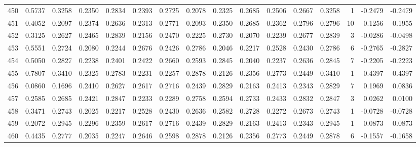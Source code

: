 \begin{tabular}{lrrrrrrrrrrrrrrr}
450 &      0.5737 &  0.3258 &  0.2350 &  0.2834 &  0.2393 &  0.2725 &  0.2078 &  0.2325 &  0.2685 &  0.2506 &   0.2667 &     0.3258 &      1 &                   -0.2479 &                    -0.2479 \\
451 &      0.4052 &  0.2097 &  0.2374 &  0.2636 &  0.2313 &  0.2771 &  0.2093 &  0.2350 &  0.2685 &  0.2362 &   0.2796 &     0.2796 &     10 &                   -0.1256 &                    -0.1955 \\
452 &      0.3125 &  0.2627 &  0.2465 &  0.2839 &  0.2156 &  0.2470 &  0.2225 &  0.2730 &  0.2070 &  0.2239 &   0.2677 &     0.2839 &      3 &                   -0.0286 &                    -0.0498 \\
453 &      0.5551 &  0.2724 &  0.2080 &  0.2244 &  0.2676 &  0.2426 &  0.2786 &  0.2046 &  0.2217 &  0.2528 &   0.2430 &     0.2786 &      6 &                   -0.2765 &                    -0.2827 \\
454 &      0.5050 &  0.2827 &  0.2238 &  0.2401 &  0.2422 &  0.2660 &  0.2593 &  0.2845 &  0.2040 &  0.2237 &   0.2636 &     0.2845 &      7 &                   -0.2205 &                    -0.2223 \\
455 &      0.7807 &  0.3410 &  0.2325 &  0.2783 &  0.2231 &  0.2257 &  0.2878 &  0.2126 &  0.2356 &  0.2773 &   0.2449 &     0.3410 &      1 &                   -0.4397 &                    -0.4397 \\
456 &      0.0860 &  0.1696 &  0.2410 &  0.2627 &  0.2617 &  0.2716 &  0.2439 &  0.2829 &  0.2163 &  0.2413 &   0.2343 &     0.2829 &      7 &                    0.1969 &                     0.0836 \\
457 &      0.2585 &  0.2685 &  0.2421 &  0.2847 &  0.2233 &  0.2289 &  0.2758 &  0.2594 &  0.2733 &  0.2433 &   0.2832 &     0.2847 &      3 &                    0.0262 &                     0.0100 \\
458 &      0.3471 &  0.2743 &  0.2025 &  0.2217 &  0.2528 &  0.2430 &  0.2636 &  0.2582 &  0.2728 &  0.2272 &   0.2673 &     0.2743 &      1 &                   -0.0728 &                    -0.0728 \\
459 &      0.2072 &  0.2945 &  0.2296 &  0.2359 &  0.2617 &  0.2716 &  0.2439 &  0.2829 &  0.2163 &  0.2413 &   0.2343 &     0.2945 &      1 &                    0.0873 &                     0.0873 \\
460 &      0.4435 &  0.2777 &  0.2035 &  0.2247 &  0.2646 &  0.2598 &  0.2878 &  0.2126 &  0.2356 &  0.2773 &   0.2449 &     0.2878 &      6 &                   -0.1557 &                    -0.1658 \\

\end{tabular}
